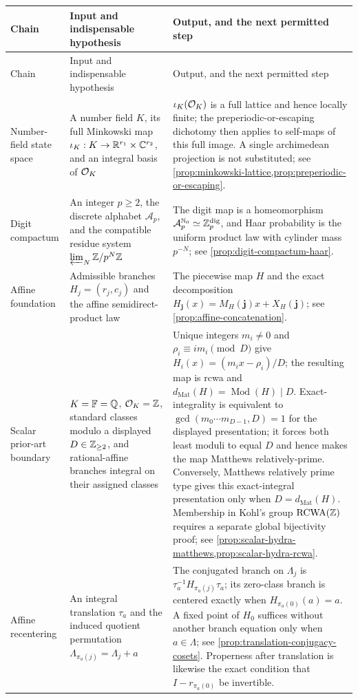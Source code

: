 \begingroup\small
\setlength{\tabcolsep}{3pt}
\begin{longtable}{@{}p{}p{}p{}@{}}
\toprule
Chain & Input and indispensable hypothesis & Output, and the next permitted
step\\
\midrule
\endfirsthead
\toprule
Chain & Input and indispensable hypothesis & Output, and the next permitted
step\\
\midrule
\endhead
Number-field state space & A number field $K$, its full Minkowski map
$\iota_K:K\to\mathbb R^{r_1}\times\mathbb C^{r_2}$, and an integral basis of $\mathcal O_K$ &
$\iota_K(\mathcal O_K)$ is a full lattice and hence locally finite; the
preperiodic-or-escaping dichotomy then applies to self-maps of this full
image.  A single archimedean projection is not substituted; see
\cref{prop:minkowski-lattice,prop:preperiodic-or-escaping}.\\

Digit compactum & An integer $p\geq2$, the discrete alphabet
$\mathcal A_p$, and the compatible residue system
$\varprojlim_N\mathbb Z/p^N\mathbb Z$ & The digit map is a homeomorphism
$\mathcal A_p^{\mathbb N_0}\simeq\mathbb Z_p^{\mathrm{dig}}$, and Haar probability is the
uniform product law with cylinder mass $p^{-N}$; see
\cref{prop:digit-compactum-haar}.\\

Affine foundation & Admissible branches
$H_j=(r_j,c_j)$ and the affine semidirect-product law & The piecewise map
$H$ and the exact decomposition
$H_{\mathbf j}(x)=M_H(\mathbf j)x+X_H(\mathbf j)$; see
\cref{prop:affine-concatenation}.\\

Scalar prior-art boundary & $K=\mathbb F=\mathbb Q$, $\mathcal O_K=\mathbb Z$, standard classes modulo a
displayed $D\in\mathbb Z_{\geq2}$, and rational-affine branches integral on their assigned
classes & Unique integers $m_i\ne0$ and $\rho_i\equiv im_i\pmod D$ give
$H_i(x)=(m_ix-\rho_i)/D$; the resulting map is rcwa and
$d_{\mathrm{Mat}}(H)=\operatorname{Mod}(H)\mid D$.  Exact-integrality is
equivalent to $\gcd(m_0\cdots m_{D-1},D)=1$ for the displayed presentation;
it forces both least moduli to equal $D$ and hence makes the map Matthews
relatively-prime.  Conversely, Matthews relatively prime type gives this
exact-integral presentation only when $D=d_{\mathrm{Mat}}(H)$.
Membership in Kohl's group
$\operatorname{RCWA}(\mathbb Z)$ requires a separate global bijectivity proof; see
\cref{prop:scalar-hydra-matthews,prop:scalar-hydra-rcwa}.\\

Affine recentering & An integral translation $\tau_a$ and the induced
quotient permutation $\Lambda_{\pi_a(j)}=\Lambda_j+a$ & The conjugated branch
on $\Lambda_j$ is $\tau_a^{-1}H_{\pi_a(j)}\tau_a$; its zero-class branch is
centered exactly when $H_{\pi_a(0)}(a)=a$.  A fixed point of $H_0$ suffices
without another branch equation only when $a\in\Lambda$; see
\cref{prop:translation-conjugacy-cosets}.  Properness after translation is
likewise the exact condition that $I-r_{\pi_a(0)}$ be invertible.\\


\end{longtable}
